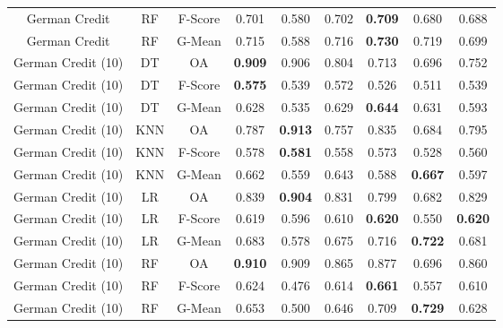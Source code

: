 \begin{longtable}{ccccccccc}
     German Credit &         RF & F-Score &          0.701 &          0.580 &          0.702 & \textbf{0.709} &          0.680 &          0.688 \\
     German Credit &         RF &  G-Mean &          0.715 &          0.588 &          0.716 & \textbf{0.730} &          0.719 &          0.699 \\
German Credit (10) &         DT &      OA & \textbf{0.909} &          0.906 &          0.804 &          0.713 &          0.696 &          0.752 \\
German Credit (10) &         DT & F-Score & \textbf{0.575} &          0.539 &          0.572 &          0.526 &          0.511 &          0.539 \\
German Credit (10) &         DT &  G-Mean &          0.628 &          0.535 &          0.629 & \textbf{0.644} &          0.631 &          0.593 \\
German Credit (10) &        KNN &      OA &          0.787 & \textbf{0.913} &          0.757 &          0.835 &          0.684 &          0.795 \\
German Credit (10) &        KNN & F-Score &          0.578 & \textbf{0.581} &          0.558 &          0.573 &          0.528 &          0.560 \\
German Credit (10) &        KNN &  G-Mean &          0.662 &          0.559 &          0.643 &          0.588 & \textbf{0.667} &          0.597 \\
German Credit (10) &         LR &      OA &          0.839 & \textbf{0.904} &          0.831 &          0.799 &          0.682 &          0.829 \\
German Credit (10) &         LR & F-Score &          0.619 &          0.596 &          0.610 & \textbf{0.620} &          0.550 & \textbf{0.620} \\
German Credit (10) &         LR &  G-Mean &          0.683 &          0.578 &          0.675 &          0.716 & \textbf{0.722} &          0.681 \\
German Credit (10) &         RF &      OA & \textbf{0.910} &          0.909 &          0.865 &          0.877 &          0.696 &          0.860 \\
German Credit (10) &         RF & F-Score &          0.624 &          0.476 &          0.614 & \textbf{0.661} &          0.557 &          0.610 \\
German Credit (10) &         RF &  G-Mean &          0.653 &          0.500 &          0.646 &          0.709 & \textbf{0.729} &          0.628 \\

\end{longtable}
